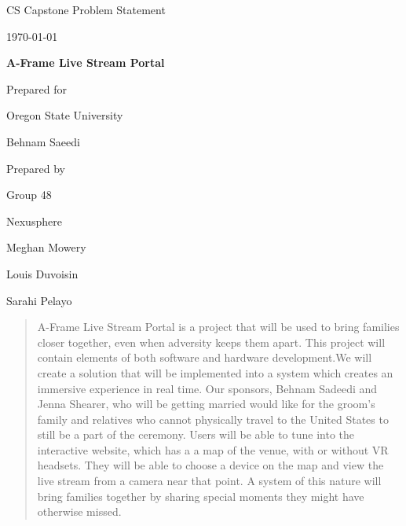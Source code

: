 \documentclass[onecolumn, draftclsnofoot,10pt, compsoc]{IEEEtran}
\def \CapstoneTeamName{		Nexusphere}
\def \CapstoneTeamNumber{		48}
\def \GroupMemberOne{			Meghan Mowery}
\def \GroupMemberTwo{			Louis Duvoisin}
\def \GroupMemberThree{			Sarahi Pelayo}
\def \CapstoneProjectName{		A-Frame Live Stream Portal}
\def \CapstoneSponsorCompany{	Oregon State University}
\def \CapstoneSponsorPerson{		Behnam Saeedi}
\def \DocType{		Problem Statement
				}
\newcommand{\NameSigPair}[1]{\par
\makebox[2.75in][r]{#1} \hfil 	\makebox[3.25in]{\makebox[2.25in]{\hrulefill} \hfill		\makebox[.75in]{\hrulefill}}
\par\vspace{-12pt} \textit{\tiny\noindent
\makebox[2.75in]{} \hfil		\makebox[3.25in]{\makebox[2.25in][r]{Signature} \hfill	\makebox[.75in][r]{Date}}}}
\renewcommand{\NameSigPair}[1]{#1}
\begin{document}
\begin{titlepage}
    \begin{singlespace}
        \hfill 
        \par\vspace{.2in}
        \centering
        \scshape{
            \huge CS Capstone \DocType \par
            {\large\today}\par
            \vspace{.5in}
            \textbf{\Huge\CapstoneProjectName}\par
            \vfill
            {\large Prepared for}\par
            \Huge \CapstoneSponsorCompany\par
            \vspace{5pt}
            {\Large\NameSigPair{\CapstoneSponsorPerson}\par}
            {\large Prepared by }\par
            Group\CapstoneTeamNumber\par
            \CapstoneTeamName\par 
            \vspace{5pt}
            {\Large
                \NameSigPair{\GroupMemberOne}\par
                \NameSigPair{\GroupMemberTwo}\par
                \NameSigPair{\GroupMemberThree}\par
            }
            \vspace{20pt}
        }
        \begin{abstract}
        	A-Frame Live Stream Portal is a project that will be used to bring families closer together, even when adversity keeps them apart. This project will contain elements of both software and hardware development.We will create a solution that will be implemented into a system which creates an immersive experience in real time. Our sponsors, Behnam Sadeedi and Jenna Shearer, who will be getting married would like for the groom’s family and relatives who cannot physically travel to the United States to still be a part of the ceremony. Users will be able to tune into the interactive website,  which has a a map of the venue, with or without VR headsets. They will be able to choose a device on the map and view the live stream from a camera near that point. A system of this nature will bring families together by sharing special moments they might have otherwise missed. 
        \end{abstract}     
    \end{singlespace}
\end{titlepage}
\newpage
{}
\tableofcontents
\clearpage
\end{document}

